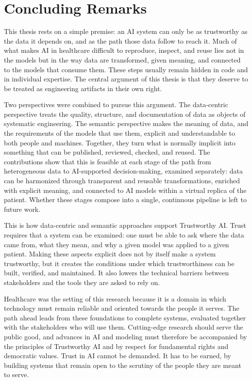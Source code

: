 \section{Concluding Remarks}
\label{sec:conclusions_remarks}

This thesis rests on a simple premise: an AI system can only be as trustworthy as the data it depends on, and as the path those data follow to reach it. Much of what makes AI in healthcare difficult to reproduce, inspect, and reuse lies not in the models but in the way data are transformed, given meaning, and connected to the models that consume them. These steps usually remain hidden in code and in individual expertise. The central argument of this thesis is that they deserve to be treated as engineering artifacts in their own right.

Two perspectives were combined to pursue this argument. The data-centric perspective treats the quality, structure, and documentation of data as objects of systematic engineering. The semantic perspective makes the meaning of data, and the requirements of the models that use them, explicit and understandable to both people and machines. Together, they turn what is normally implicit into something that can be published, reviewed, checked, and reused. The contributions show that this is feasible at each stage of the path from heterogeneous data to AI-supported decision-making, examined separately: data can be harmonized through transparent and reusable transformations, enriched with explicit meaning, and connected to AI models within a virtual replica of the patient. Whether these stages compose into a single, continuous pipeline is left to future work.

This is how data-centric and semantic approaches support Trustworthy AI. Trust requires that a system can be examined: one must be able to ask where the data came from, what they mean, and why a given model was applied to a given patient. Making these aspects explicit does not by itself make a system trustworthy, but it creates the conditions under which trustworthiness can be built, verified, and maintained. It also lowers the technical barriers between stakeholders and the tools they are asked to rely on.

Healthcare was the setting of this research because it is a domain in which technology must remain reliable and oriented towards the people it serves. The path ahead leads from these foundations to complete systems, evaluated together with the stakeholders who will use them. Cutting-edge research should serve the public good, and advances in AI and modeling must therefore be accompanied by the principles of Trustworthy AI and by respect for fundamental rights and democratic values. Trust in AI cannot be demanded. It has to be earned, by building systems that remain open to the scrutiny of the people they are meant to serve.
